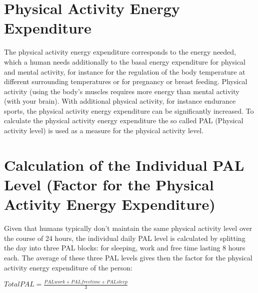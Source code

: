 \documentclass[../main.tex]{subfiles}
\begin{document}
\section{Physical Activity Energy Expenditure}

The physical activity energy expenditure corresponds to the energy needed, which a human needs additionally to the basal energy expenditure for physical and mental activity, for instance for the regulation of the body temperature at different surrounding temperatures or for pregnancy or breast feeding.
Physical activity (using the body's muscles requires more energy than mental activity (with your brain). With additional physical activity, for instance endurance sports, the physical activity energy expenditure can be significantly increased.
To calculate the physical activity energy expenditure the so called PAL (Physical activity level) is used as a measure for the physical activity level.

\section[Calculation of the Individual PAL Level]{Calculation of the Individual PAL Level (Factor for the Physical Activity Energy Expenditure)}

Given that humans typically don't maintain the same physical activity level over the course of 24 hours, the individual daily PAL level is calculated by splitting the day into three PAL blocks: for sleeping, work and free time lasting 8 hours each.
The average of these three PAL levels gives then the factor for the physical activity energy expenditure of the person:

\vspace{2mm}

\begin{center}
\begin{fminipage}{7cm}
$ Total PAL = \frac{PAL work + PAL free time + PAL sleep}{3}$ 
\end{fminipage}
\end{center}

\vspace{2mm}
\end{document}
